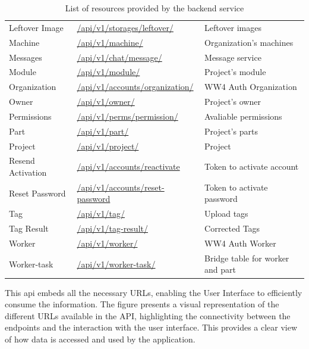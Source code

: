 \begin{table}[!h]
\begin{tabular}{l l l }
Leftover Image & \href{http://193.136.195.25/ww4/api/v1/storages/leftover/}{/api/v1/storages/leftover/} & Leftover images\\
Machine & \href{http://193.136.195.25/ww4/api/v1/machine/}{/api/v1/machine/} &  Organization's machines \\
Messages & \href{http://193.136.195.25/ww4/api/v1/chat/message/}{/api/v1/chat/message/} & Message service \\
Module & \href{http://193.136.195.25/ww4/api/v1/module/}{/api/v1/module/} & Project's module\\
Organization & \href{http://193.136.195.25/ww4/api/v1/accounts/organization/}{/api/v1/accounts/organization/} & WW4 Auth Organization \\
Owner & \href{http://193.136.195.25/ww4/api/v1/owner/}{/api/v1/owner/} & Project's owner \\
Permissions & \href{http://193.136.195.25/ww4/api/v1/perms/permission/}{/api/v1/perms/permission/} & Avaliable permissions \\
Part & \href{http://193.136.195.25/ww4/api/v1/part/}{/api/v1/part/} & Project's parts \\
Project & \href{http://193.136.195.25/ww4/api/v1/project/}{/api/v1/project/} & Project\\
Resend Activation & \href{http://193.136.195.25/ww4/api/v1/accounts/reactivate}{/api/v1/accounts/reactivate} & Token to activate account\\
Reset Password & \href{http://193.136.195.25/ww4/api/v1/accounts/reset-password}{/api/v1/accounts/reset-password} & Token to activate password \\
Tag & \href{http://193.136.195.25/ww4/api/v1/tag/}{/api/v1/tag/} & Upload tags \\
Tag Result & \href{http://193.136.195.25/ww4/api/v1/tag-result/}{/api/v1/tag-result/} & Corrected Tags \\
Worker & \href{http://193.136.195.25/ww4/api/v1/worker/}{/api/v1/worker/} & WW4 Auth Worker \\
Worker-task & \href{http://193.136.195.25/ww4/api/v1/worker-task/}{/api/v1/worker-task/} & Bridge table for worker and part \\
\hline
\end{tabular}
\caption{List of resources provided by the backend service}
\label{tab:backend_resources}
\end{table}

 This \gls{api} embeds all the necessary URLs, enabling the User Interface to efficiently consume the information. The figure presents a visual representation of the different URLs available in the API, highlighting the connectivity between the endpoints and the interaction with the user interface. This provides a clear view of how data is accessed and used by the application.


